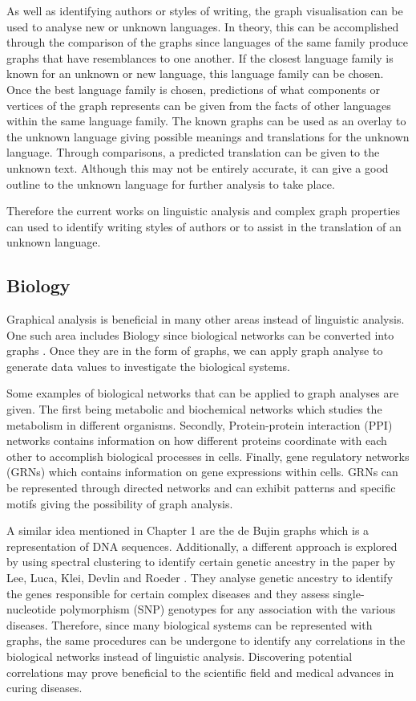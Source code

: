 As well as identifying authors or styles of writing, the graph visualisation can be used to analyse new or unknown languages. In theory, this can be accomplished through the comparison of the graphs since languages of the same family produce graphs that have resemblances to one another. If the closest language family is known for an unknown or new language, this language family can be chosen. Once the best language family is chosen, predictions of what components or vertices of the graph represents can be given from the facts of other languages within the same language family. The known graphs can be used as an overlay to the unknown language giving possible meanings and translations for the unknown language. Through comparisons, a predicted translation can be given to the unknown text. Although this may not be entirely accurate, it can give a good outline to the unknown language for further analysis to take place.

Therefore the current works on linguistic analysis and complex graph properties can used to identify writing styles of authors or to assist in the translation of an unknown language.

\subsection{Biology}
Graphical analysis is beneficial in many other areas instead of linguistic analysis. One such area includes Biology since biological networks can be converted into graphs \cite{lesne2006complex}. Once they are in the form of graphs, we can apply graph analyse to generate data values to investigate the biological systems. 

Some examples of biological networks \cite{pavlopoulos2011using} that can be applied to graph analyses are given. The first being metabolic and biochemical networks which studies the metabolism in different organisms. Secondly, Protein-protein interaction (PPI) networks contains information on how different proteins coordinate with each other to accomplish biological processes in cells. Finally, gene regulatory networks (GRNs) which contains information on gene expressions within cells. GRNs can be represented through directed networks and can exhibit patterns and specific motifs giving the possibility of graph analysis. 

A similar idea mentioned in Chapter 1 are the de Bujin graphs which is a representation of DNA sequences. Additionally, a different approach is explored by using spectral clustering to identify certain genetic ancestry in the paper by Lee, Luca, Klei, Devlin and Roeder \cite{lee2010discovering}. They analyse genetic ancestry to identify the genes responsible for certain complex diseases and they assess single-nucleotide polymorphism (SNP) genotypes for any association with the various diseases. Therefore, since many biological systems can be represented with graphs, the same procedures can be undergone to identify any correlations in the biological networks instead of linguistic analysis. Discovering potential correlations may prove beneficial to the scientific field and medical advances in curing diseases.

